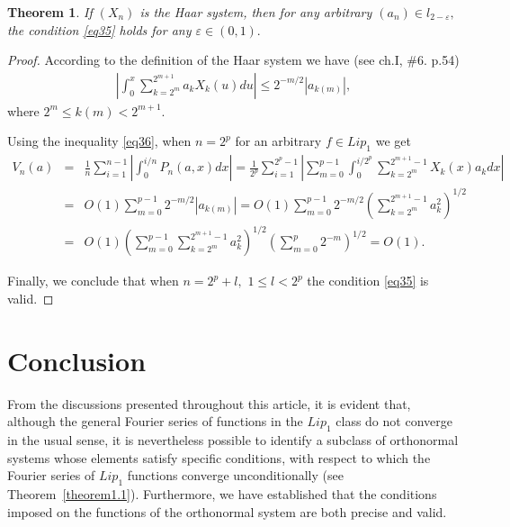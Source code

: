 \documentclass{publmathdeb}
\newtheorem{theorem}{Theorem}[section]
\begin{document}
	\begin{theorem}
		\label{theorem8}
		If $(X_n)$ is the Haar system, then for any arbitrary $(a_n)\in l_{2-\varepsilon},$ the condition \eqref{eq35} holds for any $\varepsilon \in (0,1).$
	\end{theorem}
	
	\begin{proof}
		According to the definition of the Haar system we have (see \cite{Alexits} ch.I, \#6. p.54)
		\begin{eqnarray*} 
			\left|\int_{0}^{x} \sum_{k=2^m}^{2^{m+1}} a_k X_{k}(u) du\right| \leq 2^{-m/2} \left|a_{k(m)}\right|,
		\end{eqnarray*}
		where $2^m \leq k(m) < 2^{m+1}$.
		
		Using the  inequality \eqref{eq36}, when $n=2^p$ for an arbitrary $f\in Lip_1$ we get
		\begin{eqnarray*}
			V_n (a)&=&\frac{1}{n} \sum_{i=1}^{n-1} \left| \int_{0}^{i/n} P_n(a,x) dx \right| = \frac{1}{2^p} \sum_{i=1}^{2^p-1} \left|\sum_{m=0}^{p-1} \int_{0}^{i/{2^p}} \sum_{k=2^m}^{2^{m+1}-1}X_k(x)a_k dx\right|  \\
			&=& O(1) \sum_{m=0}^{p-1} 2^{-m/2} \left|a_{k(m)}\right| = O(1) \sum_{m=0}^{p-1} 2^{-m/2} \left(  \sum_{k=2^m}^{2^{m+1}-1}  a_{k}^{2} \right)^{1/2} \\
			&=&O(1) \left(\sum_{m=0}^{p-1}  \sum_{k=2^m}^{2^{m+1}-1}  a_{k}^{2} \right)^{1/2} \left(\sum_{m=0}^{p} 2^{-m}\right)^{1/2}=  O(1).
		\end{eqnarray*}
		
		Finally, we conclude that when $n=2^p+l,$ $1\leq l<2^p$ the condition \eqref{eq35} is valid.
		
	\end{proof}
	
	
	\section{Conclusion}
	From the discussions presented throughout this article, it is evident that, although the general Fourier series of functions in the \(Lip_1\) class do not converge in the usual sense, it is nevertheless possible to identify a subclass of orthonormal systems whose elements satisfy specific conditions, with respect to which the Fourier series of \(Lip_1\) functions converge unconditionally (see Theorem~\ref{theorem1.1}). Furthermore, we have established that the conditions imposed on the functions of the orthonormal system are both precise and valid.
	
\end{document}
